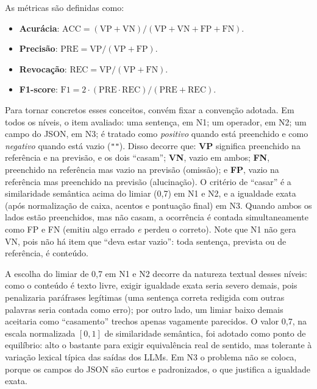 As métricas são definidas como:

\begin{itemize}
    \item \textbf{Acurácia}: \(\mathrm{ACC} = (\mathrm{VP} + \mathrm{VN})/(\mathrm{VP} + \mathrm{VN} + \mathrm{FP} + \mathrm{FN})\).
    \item \textbf{Precisão}: \(\mathrm{PRE} = \mathrm{VP}/(\mathrm{VP} + \mathrm{FP})\).
    \item \textbf{Revocação}: \(\mathrm{REC} = \mathrm{VP}/(\mathrm{VP} + \mathrm{FN})\).
    \item \textbf{F1-score}: \(\mathrm{F1} = 2 \cdot (\mathrm{PRE} \cdot \mathrm{REC})/(\mathrm{PRE} + \mathrm{REC})\).
\end{itemize}

Para tornar concretos esses conceitos, convém fixar a convenção adotada. Em todos os níveis, o item avaliado: uma sentença, em N1; um operador, em N2; um campo do JSON, em N3; é tratado como \textit{positivo} quando está preenchido e como \textit{negativo} quando está vazio (\verb|""|). Disso decorre que: \textbf{VP} significa preenchido na referência e na previsão, e os dois ``casam''; \textbf{VN}, vazio em ambos; \textbf{FN}, preenchido na referência mas vazio na previsão (omissão); e \textbf{FP}, vazio na referência mas preenchido na previsão (alucinação). O critério de ``casar'' é a similaridade semântica acima do limiar (0{,}7) em N1 e N2, e a igualdade exata (após normalização de caixa, acentos e pontuação final) em N3. Quando ambos os lados estão preenchidos, mas não casam, a ocorrência é contada simultaneamente como FP e FN (emitiu algo errado \emph{e} perdeu o correto). Note que N1 não gera VN, pois não há item que ``deva estar vazio'': toda sentença, prevista ou de referência, é conteúdo.

A escolha do limiar de 0{,}7 em N1 e N2 decorre da natureza textual desses níveis: como o conteúdo é texto livre, exigir igualdade exata seria severo demais, pois penalizaria paráfrases legítimas (uma sentença correta redigida com outras palavras seria contada como erro); por outro lado, um limiar baixo demais aceitaria como ``casamento'' trechos apenas vagamente parecidos. O valor 0{,}7, na escala normalizada $[0,1]$ de similaridade semântica, foi adotado como ponto de equilíbrio: alto o bastante para exigir equivalência real de sentido, mas tolerante à variação lexical típica das saídas dos LLMs. Em N3 o problema não se coloca, porque os campos do JSON são curtos e padronizados, o que justifica a igualdade exata.

